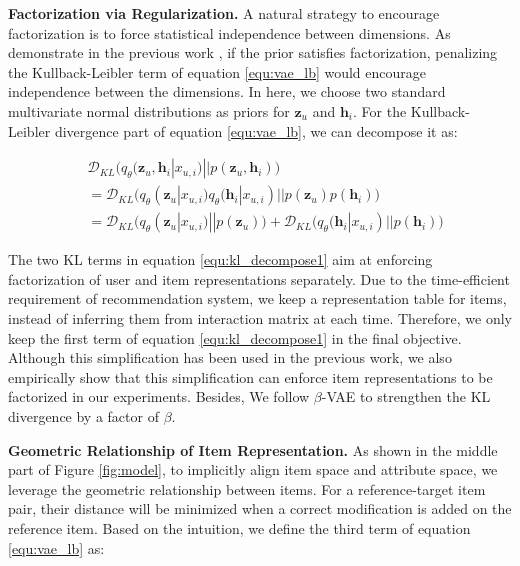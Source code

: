 \textbf{Factorization via Regularization.} A natural strategy to encourage factorization is to force statistical independence between dimensions. 
As demonstrate in the previous work \cite{Higgins17betaVAE}, if the prior satisfies factorization, penalizing the Kullback-Leibler term of equation \ref{equ:vae_lb} would encourage independence between the dimensions. In here, we choose two standard multivariate normal distributions as priors for $\mathbf{z}_u$ and $\mathbf{h}_i$. For the Kullback-Leibler divergence part of equation \ref{equ:vae_lb},  we can decompose it as:

\begin{equation}
\begin{split}
&\mathcal{D}_{KL}\big(q_{\theta}(\mathbf{z}_{u}, \mathbf{h}_{i}|x_{u,i}) || p(\mathbf{z}_{u}, \mathbf{h}_{i}) \big) \\
&= \mathcal{D}_{KL}\big(q_{\theta}(\mathbf{z}_{u}|x_{u,i}) q_{\theta}(\mathbf{h}_{i}|x_{u,i})|| p(\mathbf{z}_{u}) p ({ \mathbf{h}_{i}})\big)\\
&= \mathcal{D}_{KL}\big(q_{\theta}(\mathbf{z}_{u}|x_{u,i})||p(\mathbf{z}_{u})\big) + \mathcal{D}_{KL}\big(q_{\theta}(\mathbf{h}_{i}|x_{u,i})||p(\mathbf{h}_{i})\big) 
\end{split}
\label{equ:kl_decompose1}
\end{equation}

The two KL terms in equation \ref{equ:kl_decompose1} aim at enforcing factorization of user and item representations separately.
Due to the time-efficient requirement of recommendation system, we keep a representation table for items, instead of inferring them from interaction matrix at each time. Therefore, we only keep the first term of equation \ref{equ:kl_decompose1} in the final objective. Although this simplification has been used in the previous work\cite{mazhou0Y019MacridVAE}, we also empirically show  that this simplification can enforce item representations to be factorized in our experiments. Besides, We follow $\beta$-VAE\cite{Higgins17betaVAE} to strengthen the KL divergence by a factor of $\beta$.

\textbf{Geometric Relationship of Item Representation.} As shown in the middle part of Figure \ref{fig:model}, to implicitly align item space and attribute space, we leverage the geometric relationship between items. For a reference-target item pair, their distance will be minimized when a correct modification is added on the reference item. Based on the intuition, we define the third term of equation \ref{equ:vae_lb} as:

